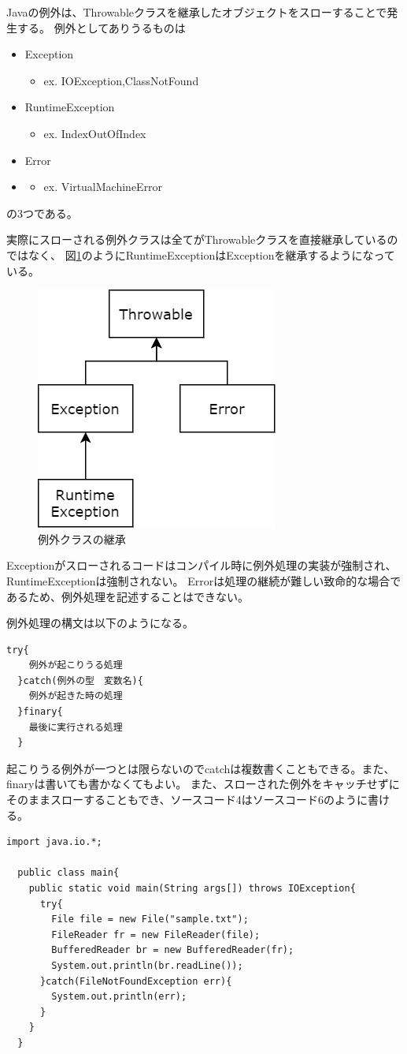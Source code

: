 \documentclass[dvipdfmx]{jsarticle}
\begin{document}
Javaの例外は、Throwableクラスを継承したオブジェクトをスローすることで発生する。
例外としてありうるものは
\begin{itemize}
  \item Exception
  \begin{itemize}
    \item ex. IOException,ClassNotFound
  \end{itemize}
  \item RuntimeException
  \begin{itemize}
    \item ex. IndexOutOfIndex
  \end{itemize}
  \item Error
  \item \begin{itemize}
    \item ex. VirtualMachineError
  \end{itemize}
\end{itemize}
の3つである。

実際にスローされる例外クラスは全てがThrowableクラスを直接継承しているのではなく、
図\ref{throwable}のようにRuntimeExceptionはExceptionを継承するようになっている。
\begin{figure}[H]
  \centering
  \includegraphics[width=0.3\hsize]{../pic/1.png}
  \caption{例外クラスの継承}
  \label{throwable}
\end{figure}

Exceptionがスローされるコードはコンパイル時に例外処理の実装が強制され、
RuntimeExceptionは強制されない。
Errorは処理の継続が難しい致命的な場合であるため、例外処理を記述することはできない。

例外処理の構文は以下のようになる。
\begin{lstlisting}[caption=例外処理の構文]
  try{
    例外が起こりうる処理
  }catch(例外の型　変数名){
    例外が起きた時の処理
  }finary{
    最後に実行される処理
  }
\end{lstlisting}
起こりうる例外が一つとは限らないのでcatchは複数書くこともできる。また、finaryは書いても書かなくてもよい。
また、スローされた例外をキャッチせずにそのままスローすることもでき、ソースコード4はソースコード6のように書ける。
\begin{lstlisting}[caption=例外処理を行わずにスローする]
  import java.io.*;

  public class main{
    public static void main(String args[]) throws IOException{
      try{
        File file = new File("sample.txt");
        FileReader fr = new FileReader(file);
        BufferedReader br = new BufferedReader(fr);
        System.out.println(br.readLine());
      }catch(FileNotFoundException err){
        System.out.println(err);
      }
    }
  }
\end{lstlisting}
\end{document}
